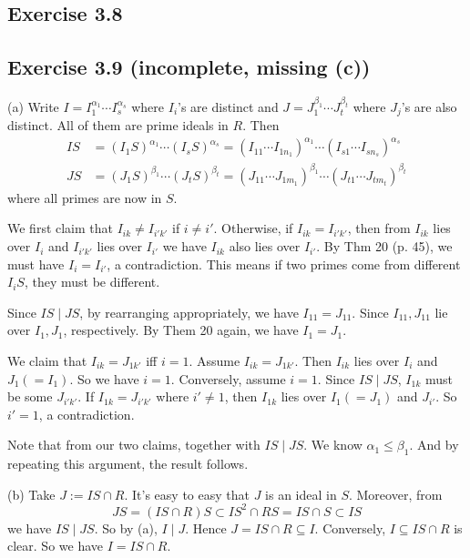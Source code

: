 \documentclass[../Marcus.tex]{subfiles}
\begin{document}
\subsection*{Exercise 3.8}

\subsection*{Exercise 3.9 \color{red}(incomplete, missing (c))}

(a) Write $I=I_1^{\alpha_1}\cdots I_s^{\alpha_s}$ where $I_i$'s are distinct and $J=J_1^{\beta_1}\cdots J_t^{\beta_t}$ where $J_j$'s are also distinct. All of them are prime ideals in $R$. Then
\begin{align*}
IS &= (I_1S)^{\alpha_1}\cdots (I_sS)^{\alpha_s}=(I_{11}\cdots I_{1n_1})^{\alpha_1}\cdots (I_{s1}\cdots I_{sn_s})^{\alpha_s} \\
JS &= (J_1S)^{\beta_1}\cdots (J_tS)^{\beta_t}=(J_{11}\cdots J_{1m_1})^{\beta_1}\cdots (J_{t1}\cdots J_{tm_t})^{\beta_t}
\end{align*}
where all primes are now in $S$.

We first claim that $I_{ik}\neq I_{i'k'}$ if $i\neq i'$. Otherwise, if $I_{ik}=I_{i'k'}$, then from $I_{ik}$ lies over $I_i$ and $I_{i'k'}$ lies over $I_{i'}$ we have $I_{ik}$ also lies over $I_{i'}$. By Thm 20 (p. 45), we must have $I_i=I_{i'}$, a contradiction. This means if two primes come from different $I_iS$, they must be different.

Since $IS\mid JS$, by rearranging appropriately, we have $I_{11}=J_{11}$. Since $I_{11},J_{11}$ lie over $I_1,J_1$, respectively. By Them 20 again, we have $I_1=J_1$.

We claim that $I_{ik}=J_{1k'}$ iff $i=1$. Assume $I_{ik}=J_{1k'}$. Then $I_{ik}$ lies over $I_i$ and $J_1(=I_1)$. So we have $i=1$. Conversely, assume $i=1$. Since $IS\mid JS$, $I_{1k}$ must be some $J_{i'k'}$. If $I_{1k}=J_{i'k'}$ where $i'\neq 1$, then $I_{1k}$ lies over $I_1(=J_1)$ and $J_{i'}$. So $i'=1$, a contradiction.

Note that from our two claims, together with $IS\mid JS$. We know $\alpha_1\leq \beta_1$. And by repeating this argument, the result follows.

(b) Take $J:=IS\cap R$. It's easy to easy that $J$ is an ideal in $S$. Moreover, from $$JS=(IS\cap R)S\subset IS^2\cap RS=IS\cap S\subset IS$$ we have $IS\mid JS$. So by (a), $I\mid J$. Hence $J=IS\cap R\subseteq I$. Conversely, $I\subseteq IS\cap R$ is clear. So we have $I=IS\cap R$.
\end{document}
